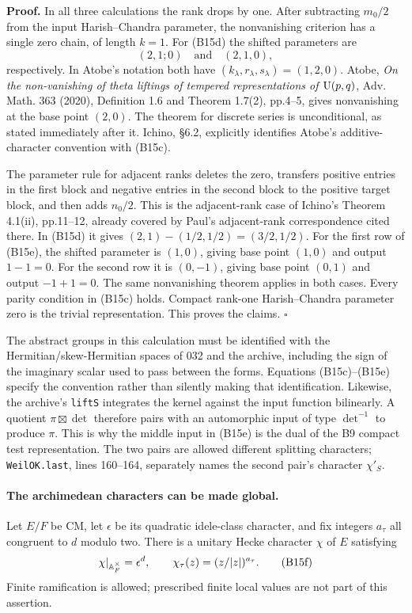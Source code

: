 \documentclass[11pt]{article}
\theoremstyle{definition}\newtheorem{definition}[theorem]{Definition}\newtheorem{remark}[theorem]{Remark}
\begin{document}
\textbf{Proof.}
In all three calculations the rank drops by one. After subtracting $m_0/2$ from the input Harish--Chandra parameter, the nonvanishing criterion has a single zero chain, of length $k=1$. For (B15d) the shifted parameters are
\[
 (2,1;0)\quad\text{and}\quad(2,1,0),
\]
respectively. In Atobe's notation both have $(k_\lambda,r_\lambda,s_\lambda)=(1,2,0)$. Atobe, \emph{On the non-vanishing of theta liftings of tempered representations of $\operatorname{U}(p,q)$}, Adv. Math. 363 (2020), Definition 1.6 and Theorem 1.7(2), pp.4--5, gives nonvanishing at the base point $(2,0)$. The theorem for discrete series is unconditional, as stated immediately after it. Ichino, \S6.2, explicitly identifies Atobe's additive-character convention with (B15c).

The parameter rule for adjacent ranks deletes the zero, transfers positive entries in the first block and negative entries in the second block to the positive target block, and then adds $n_0/2$. This is the adjacent-rank case of Ichino's Theorem 4.1(ii), pp.11--12, already covered by Paul's adjacent-rank correspondence cited there. In (B15d) it gives $(2,1)-(1/2,1/2)=(3/2,1/2)$. For the first row of (B15e), the shifted parameter is $(1,0)$, giving base point $(1,0)$ and output $1-1=0$. For the second row it is $(0,-1)$, giving base point $(0,1)$ and output $-1+1=0$. The same nonvanishing theorem applies in both cases. Every parity condition in (B15c) holds. Compact rank-one Harish--Chandra parameter zero is the trivial representation. This proves the claims. \hfill$\square$

The abstract groups in this calculation must be identified with the Hermitian/skew-Hermitian spaces of 032 and the archive, including the sign of the imaginary scalar used to pass between the forms. Equations (B15c)--(B15e) specify the convention rather than silently making that identification. Likewise, the archive's \texttt{liftS} integrates the kernel against the input function bilinearly. A quotient $\pi\boxtimes\det$ therefore pairs with an automorphic input of type $\det^{-1}$ to produce $\pi$. This is why the middle input in (B15e) is the dual of the B9 compact test representation. The two pairs are allowed different splitting characters; \texttt{WeilOK.last}, lines 160--164, separately names the second pair's character $\chi'_S$.

\paragraph{The archimedean characters can be made global.}
Let $E/F$ be CM, let $\epsilon$ be its quadratic idele-class character, and fix integers $a_\tau$ all congruent to $d$ modulo two. There is a unitary Hecke character $\chi$ of $E$ satisfying
\[
 \chi|_{\mathbb A_F^\times}=\epsilon^d,
 \qquad \chi_\tau(z)=(z/|z|)^{a_\tau}.
 \tag{B15f}
\]
Finite ramification is allowed; prescribed finite local values are not part of this assertion.
\end{document}

